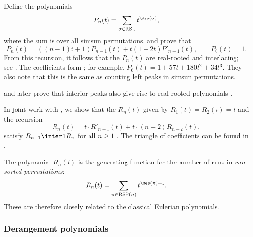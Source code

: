 \begin{example*}
Define the polynomials
\[
  P_n(t)=\sum_{\sigma\in \mathrm{RS}_n} t^{\des(\sigma)},
\]
where the sum is over all \hyperref[namedPermutations]{simsun permutations}.
 and  prove that
\begin{equation}
 P_n(t) = ((n-1)t + 1) P_{n-1}(t) + t(1-2t) P'_{n-1}(t), \qquad P_0(t)=1.
\end{equation}
From this recursion, it follows that the \(P_n(t)\) are real-rooted and
interlacing; see \cite[Thm.~2.1 (iii)]{ChowShiu2011}.  The coefficients
form ; for example, $P_6(t)=1+57t+180t^2+34t^3$.
They also note that this is the same as counting left peaks in simsun
permutations.

 and  later prove that interior peaks
also give rise to real-rooted polynomials \cite{MaYeh2016}.
\end{example*}




\begin{example*}
In joint work with , we show that the
\label{runSortedDescentPolynomial}
$R_n(t)$ given by $R_1(t)=R_2(t)=t$ and the recursion
\begin{equation}
R_n(t) = t\cdot R'_{n-1}(t) + t\cdot (n-2) R_{n-2}(t),
\end{equation}
satisfy $R_{n-1} \interl R_{n}$ for all $n \geq 1$
\cite{AlexanderssonNabawanda2021}.
The triangle of coefficients can be found in .

The polynomial $R_n(t)$ is the generating function for the number of runs in
\emph{run-sorted permutations}:
\[
 R_n(t) = \sum_{\pi \in \text{RSP}(n)} t^{\des(\pi)+1}.
\]
These are therefore closely related to the
\hyperref[eulerianPolynomial]{classical Eulerian polynomials}.
\end{example*}


\subsubsection[derangementPolynomialsRealRooted]{Derangement polynomials}

